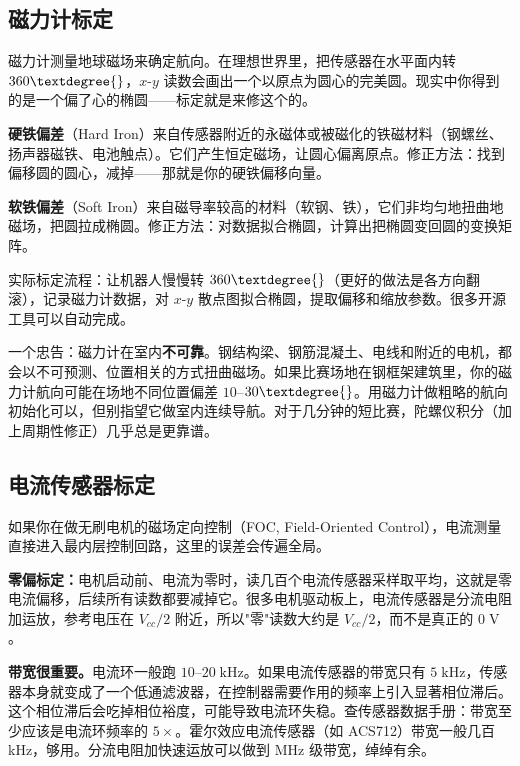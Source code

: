 \subsection{磁力计标定}

磁力计测量地球磁场来确定航向。在理想世界里，把传感器在水平面内转 $360\textdegree{}$，$x$-$y$ 读数会画出一个以原点为圆心的完美圆。现实中你得到的是一个偏了心的椭圆——标定就是来修这个的。

\textbf{硬铁偏差}（Hard Iron）来自传感器附近的永磁体或被磁化的铁磁材料（钢螺丝、扬声器磁铁、电池触点）。它们产生恒定磁场，让圆心偏离原点。修正方法：找到偏移圆的圆心，减掉——那就是你的硬铁偏移向量。

\textbf{软铁偏差}（Soft Iron）来自磁导率较高的材料（软钢、铁），它们非均匀地扭曲地磁场，把圆拉成椭圆。修正方法：对数据拟合椭圆，计算出把椭圆变回圆的变换矩阵。

实际标定流程：让机器人慢慢转 $360\textdegree{}$（更好的做法是各方向翻滚），记录磁力计数据，对 $x$-$y$ 散点图拟合椭圆，提取偏移和缩放参数。很多开源工具可以自动完成。

一个忠告：磁力计在室内\textbf{不可靠}。钢结构梁、钢筋混凝土、电线和附近的电机，都会以不可预测、位置相关的方式扭曲磁场。如果比赛场地在钢框架建筑里，你的磁力计航向可能在场地不同位置偏差 $10$--$30\textdegree{}$。用磁力计做粗略的航向初始化可以，但别指望它做室内连续导航。对于几分钟的短比赛，陀螺仪积分（加上周期性修正）几乎总是更靠谱。

\subsection{电流传感器标定}

如果你在做无刷电机的磁场定向控制（FOC, Field-Oriented Control），电流测量直接进入最内层控制回路，这里的误差会传遍全局。

\textbf{零偏标定：}电机启动前、电流为零时，读几百个电流传感器采样取平均，这就是零电流偏移，后续所有读数都要减掉它。很多电机驱动板上，电流传感器是分流电阻加运放，参考电压在 $V_{cc}/2$ 附近，所以"零"读数大约是 $V_{cc}/2$，而不是真正的 $0\;\mathrm{V}$。

\textbf{带宽很重要。}电流环一般跑 $10$--$20\;\mathrm{kHz}$。如果电流传感器的带宽只有 $5\;\mathrm{kHz}$，传感器本身就变成了一个低通滤波器，在控制器需要作用的频率上引入显著相位滞后。这个相位滞后会吃掉相位裕度，可能导致电流环失稳。查传感器数据手册：带宽至少应该是电流环频率的 $5\times$。霍尔效应电流传感器（如 ACS712）带宽一般几百 kHz，够用。分流电阻加快速运放可以做到 MHz 级带宽，绰绰有余。

